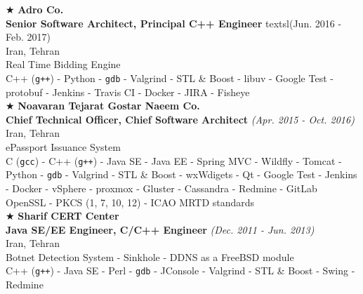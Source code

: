 \documentclass[10pt,a4paper]{article}
\begin{document}
\noindent $\bigstar$ \hspace{0.1cm} \large \textbf{Adro Co.} \\
\indent \small \textbf{Senior Software Architect, Principal C++ Engineer} textsl{(Jun. 2016 - Feb. 2017)} \\
\indent \textnormal{Iran, Tehran} \\
\indent \textbullet \hspace{0.05cm} Real Time Bidding Engine \\
\indent \textbullet \hspace{0.05cm} C++ (\texttt{g++}) - Python - \texttt{gdb} - Valgrind - STL \& Boost - libuv - Google Test - protobuf - Jenkins - Travis CI - Docker - JIRA - Fisheye \\

\noindent $\bigstar$ \hspace{0.1cm} \large \textbf{Noavaran Tejarat Gostar Naeem Co.} \\
\indent \small \textbf{Chief Technical Officer, Chief Software Architect} \textsl{(Apr. 2015 - Oct. 2016)} \\
\indent \textnormal{Iran, Tehran} \\
\indent \textbullet \hspace{0.05cm} ePassport Issuance System \\
\indent \textbullet \hspace{0.05cm} C (\texttt{gcc}) - C++ (\texttt{g++}) - Java SE - Java EE - Spring MVC - Wildfly - Tomcat - Python - \texttt{gdb} - Valgrind - STL \& Boost - wxWdigets - Qt - Google Test - Jenkins - Docker - vSphere - proxmox - Gluster - Cassandra - Redmine - GitLab \\
\indent \textbullet \hspace{0.05cm} OpenSSL - PKCS (1, 7, 10, 12) - ICAO MRTD standards \\

\noindent $\bigstar$ \hspace{0.1cm} \large \textbf{Sharif CERT Center} \\ 
\indent \small \textbf{Java SE/EE Engineer, C/C++ Engineer} \textsl{(Dec. 2011 - Jun. 2013)} \\
\indent \textnormal{Iran, Tehran} \\ 
\indent \textbullet \hspace{0.05cm} Botnet Detection System - Sinkhole - DDNS as a FreeBSD module \\
\indent \textbullet \hspace{0.05cm} C++ (\texttt{g++}) - Java SE - Perl - \texttt{gdb} - JConsole - Valgrind - STL \& Boost - Swing - Redmine \\
\end{document}
